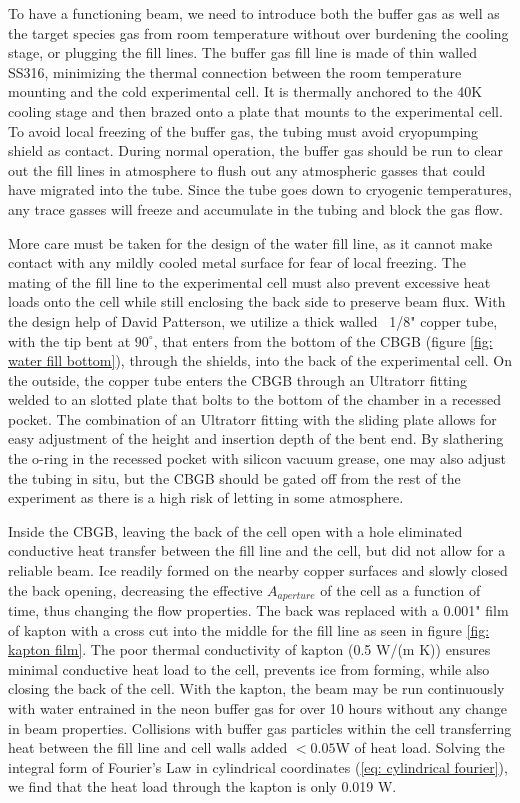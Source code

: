 To have a functioning beam, we need to introduce both the buffer gas as well as the target species gas from room temperature without over burdening the cooling stage, or plugging the fill lines. The buffer gas fill line is made of thin walled SS316, minimizing the thermal connection between the room temperature mounting and the cold experimental cell. It is thermally anchored to the 40K cooling stage and then brazed onto a plate that mounts to the experimental cell. To avoid local freezing of the buffer gas, the tubing must avoid cryopumping shield as contact. During normal operation, the buffer gas should be run to clear out the fill lines in atmosphere to flush out any atmospheric gasses that could have migrated into the tube. Since the tube goes down to cryogenic temperatures, any trace gasses will freeze and accumulate in the tubing and block the gas flow.

More care must be taken for the design of the water fill line, as it cannot make contact with any mildly cooled metal surface for fear of local freezing. The mating of the fill line to the experimental cell must also prevent excessive heat loads onto the cell while still enclosing the back side to preserve beam flux. With the design help of David Patterson, we utilize a thick walled ~1/8" copper tube, with the tip bent at $90^\circ$, that enters from the bottom of the CBGB (figure \ref{fig: water fill bottom}), through the shields, into the back of the experimental cell. On the outside, the copper tube enters the CBGB through an Ultratorr fitting welded to an slotted plate that bolts to the bottom of the chamber in a recessed pocket. The combination of an Ultratorr fitting with the sliding plate allows for easy adjustment of the height and insertion depth of the bent end. By slathering the o-ring in the recessed pocket with silicon vacuum grease, one may also adjust the tubing in situ, but the CBGB should be gated off from the rest of the experiment as there is a high risk of letting in some atmosphere.

Inside the CBGB, leaving the back of the cell open with a hole eliminated conductive heat transfer between the fill line and the cell, but did not allow for a reliable beam. Ice readily formed on the nearby copper surfaces and slowly closed the back opening, decreasing the effective $A_{aperture}$ of the cell as a function of time, thus changing the flow properties. The back was replaced with a 0.001" film of kapton with a cross cut into the middle for the fill line as seen in figure \ref{fig: kapton film}. The poor thermal conductivity of kapton (0.5 W/(m K)) ensures minimal conductive heat load to the cell, prevents ice from forming, while also closing the back of the cell. With the kapton, the beam may be run continuously with water entrained in the neon buffer gas for over 10 hours without any change in beam properties. Collisions with buffer gas particles within the cell transferring heat between the fill line and cell walls added $<0.05$W of heat load. Solving the integral form of Fourier's Law in cylindrical coordinates (\ref{eq: cylindrical fourier}), we find that the heat load through the kapton is only 0.019 W.

